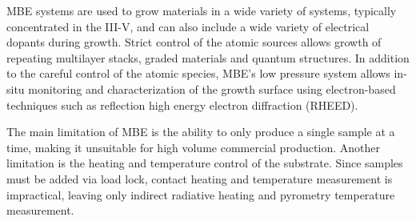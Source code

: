 MBE systems are used to grow materials in a wide variety of systems, typically concentrated in the III-V, and can also include a wide variety of electrical dopants during growth.
Strict control of the atomic sources allows growth of repeating multilayer stacks, graded materials and quantum structures.
In addition to the careful control of the atomic species, MBE's low pressure system allows in-situ monitoring and characterization of the growth surface using electron-based techniques such as reflection high energy electron diffraction (RHEED).

The main limitation of MBE is the ability to only produce a single sample at a time, making it unsuitable for high volume commercial production.
Another limitation is the heating and temperature control of the substrate.
Since samples must be added via load lock, contact heating and temperature measurement is impractical, leaving only indirect radiative heating and pyrometry temperature measurement.
